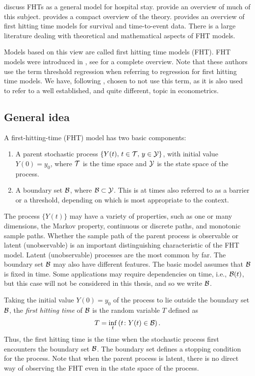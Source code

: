 \citet{eaton-whitmore} discuss FHTs as a general model for hospital stay.
\citet{aalengjessing2001} provide an overview of much of this subject.
\citet{lawless2011} provides a compact overview of the theory.
\citet{leewhitmore2004a} provides an overview of first hitting time models for survival and time-to-event data.
There is a large literature dealing with theoretical and mathematical aspects of FHT models.

Models based on this view are called first hitting time models (FHT).
FHT models were introduced in \citet{whitmore1986}, see \citet{leewhitmore2006} for a complete overview.
Note that these authors use the term threshold regression when referring to regression for first hitting time models.
We have, following \citet{caroni2017}, chosen to not use this term, as it is also used to refer to a well established, and quite different, topic in econometrics.

\subsection{General idea}\label{fht-idea}
A first-hitting-time (FHT) model has two basic components:
\begin{enumerate}
\item A parent stochastic process $\{Y(t),\,t\in\mathcal{T},\,y\in\mathcal{Y}\}$, with initial value $Y(0)=y_0$, where $\mathcal{T}$ is the time space and $\mathcal{Y}$ is the state space of the process.
\item A boundary set $\mathcal{B}$, where $\mathcal{B}\subset\mathcal{Y}$. This is at times also referred to as a barrier or a threshold, depending on which is most appropriate to the context.
\end{enumerate}
The process $\{Y(t)\}$ may have a variety of properties, such as one or many dimensions, the Markov property, continuous or discrete paths, and monotonic sample paths. Whether the sample path of the parent process is observable or latent (unobservable) is an important distinguishing characteristic of the FHT model. Latent (unobservable) processes are the most common by far. The boundary set $\mathcal{B}$ may also have different features. The basic model assumes that $\mathcal{B}$ is fixed in time.
Some applications may require dependencies on time, i.e., $\mathcal{B}(t)$, but this case will not be considered in this thesis, and so we write $\mathcal{B}$.

Taking the initial value $Y(0)=y_0$ of the process to lie outside the boundary set $\mathcal{B}$, the \textit{first hitting time} of $\mathcal{B}$ is the random variable $T$ defined as
\begin{equation}\label{eq:fht-t}
    T=\inf_t\left(t\colon Y(t)\in\mathcal{B}\right).
\end{equation}
Thus, the first hitting time is the time when the stochastic process first encounters the boundary set $\mathcal{B}$. The boundary set defines a stopping condition for the process. Note that when the parent process is latent, there is no direct way of observing the FHT even in the state space of the process.

